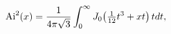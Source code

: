 \[{\mathop{\mathrm{Ai}\/}\nolimits^{2}}\!\left(x\right)=\frac{1}{4\pi\sqrt{3}}%
\int_{0}^{\infty}\mathop{J_{0}\/}\nolimits\!\left(\tfrac{1}{12}t^{3}+xt\right)tdt,\]